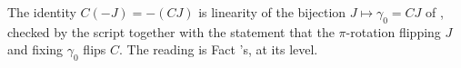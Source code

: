 The identity $C(-J) = -(CJ)$ is linearity of the bijection $J \mapsto \gamma_{0} = CJ$ of , checked by the script together with the statement that the $\pi$-rotation flipping $J$ and fixing $\gamma_{0}$ flips $C$. The reading is Fact 's, at its level.
